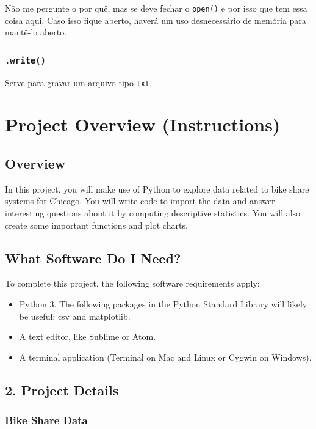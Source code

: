 \documentclass[]{book}
\providecommand{\tightlist}{%
  \setlength{\itemsep}{0pt}\setlength{\parskip}{0pt}}
\begin{document}
Não me pergunte o por quê, mas se deve fechar o \texttt{open()} e por
isso que tem essa coisa aqui. Caso isso fique aberto, haverá um uso
desnecessário de memória para mantê-lo aberto.

\subsubsection{\texorpdfstring{\texttt{.write()}}{.write()}}\label{write}

Serve para gravar um arquivo tipo \texttt{txt}.

\section{Project Overview
(Instructions)}\label{project-overview-instructions}

\subsection{Overview}\label{overview}

In this project, you will make use of Python to explore data related to
bike share systems for Chicago. You will write code to import the data
and answer interesting questions about it by computing descriptive
statistics. You will also create some important functions and plot
charts.

\subsection{What Software Do I Need?}\label{what-software-do-i-need}

To complete this project, the following software requirements apply:

\begin{itemize}
\tightlist
\item
  Python 3. The following packages in the Python Standard Library will
  likely be useful: csv and matplotlib.
\item
  A text editor, like Sublime or Atom.
\item
  A terminal application (Terminal on Mac and Linux or Cygwin on
  Windows).
\end{itemize}

\subsection{2. Project Details}\label{project-details}

\subsubsection{Bike Share Data}\label{bike-share-data}
\end{document}
